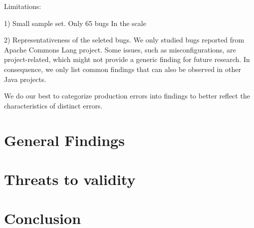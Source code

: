 



Limitations: 

1) Small sample set. Only 65 bugs  In the scale 

2) Representativeness of the seleted bugs. We only studied bugs reported from Apache Commons Lang project. Some issues, such as misconfigurations, are project-related, which might not provide a generic finding for future research. In consequence, we only list common findings that can also be observed in other Java projects. 

We do our best to categorize production errors into findings to better reflect the characteristics of distinct errors. 

\section{General Findings}


\section{Threats to validity}

\section{Conclusion}
